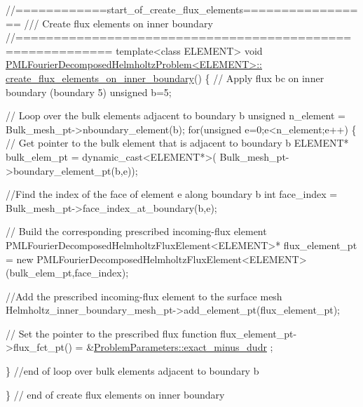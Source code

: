 
\begin{DoxyCodeInclude}
\textcolor{comment}{//============start\_of\_create\_flux\_elements=================}
\textcolor{comment}{/// Create flux elements on inner boundary}
\textcolor{comment}{}\textcolor{comment}{//==========================================================}
\textcolor{keyword}{template}<\textcolor{keyword}{class} ELEMENT>
\textcolor{keywordtype}{void}  \hyperlink{classPMLFourierDecomposedHelmholtzProblem_afd6e3401bdbd1d3deb3271553fbe1d3a}{PMLFourierDecomposedHelmholtzProblem<ELEMENT>::}
\hyperlink{classPMLFourierDecomposedHelmholtzProblem_afd6e3401bdbd1d3deb3271553fbe1d3a}{create\_flux\_elements\_on\_inner\_boundary}()
\{
 \textcolor{comment}{// Apply flux bc on inner boundary (boundary 5)}
 \textcolor{keywordtype}{unsigned} b=5;

\textcolor{comment}{// Loop over the bulk elements adjacent to boundary b}
 \textcolor{keywordtype}{unsigned} n\_element = Bulk\_mesh\_pt->nboundary\_element(b);
 \textcolor{keywordflow}{for}(\textcolor{keywordtype}{unsigned} e=0;e<n\_element;e++)
  \{
   \textcolor{comment}{// Get pointer to the bulk element that is adjacent to boundary b}
   ELEMENT* bulk\_elem\_pt = \textcolor{keyword}{dynamic\_cast<}ELEMENT*\textcolor{keyword}{>}(
    Bulk\_mesh\_pt->boundary\_element\_pt(b,e));

   \textcolor{comment}{//Find the index of the face of element e along boundary b}
   \textcolor{keywordtype}{int} face\_index = Bulk\_mesh\_pt->face\_index\_at\_boundary(b,e);

   \textcolor{comment}{// Build the corresponding prescribed incoming-flux element}
   PMLFourierDecomposedHelmholtzFluxElement<ELEMENT>*
    flux\_element\_pt = \textcolor{keyword}{new}
    PMLFourierDecomposedHelmholtzFluxElement<ELEMENT>
    (bulk\_elem\_pt,face\_index);

   \textcolor{comment}{//Add the prescribed incoming-flux element to the surface mesh}
   Helmholtz\_inner\_boundary\_mesh\_pt->add\_element\_pt(flux\_element\_pt);

   \textcolor{comment}{// Set the pointer to the prescribed flux function}
   flux\_element\_pt->flux\_fct\_pt() = &\hyperlink{namespaceProblemParameters_aa544d1f3e384d3283f7113512931ea8f}{ProblemParameters::exact\_minus\_dudr}
      ;

  \} \textcolor{comment}{//end of loop over bulk elements adjacent to boundary b}

\} \textcolor{comment}{// end of create flux elements on inner boundary}

\end{DoxyCodeInclude}




